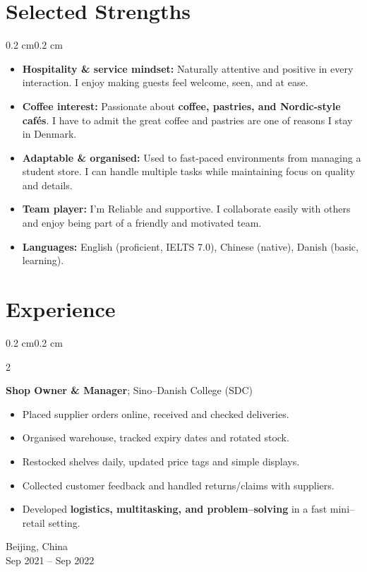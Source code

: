 \documentclass[10pt, letterpaper]{article}
\newenvironment{highlights}{
    \begin{itemize}[
        topsep=0.08 cm,
        parsep=0.08 cm,
        partopsep=0pt,
        itemsep=0pt,
        leftmargin=0.4 cm + 10pt
    ]
}{
    \end{itemize}
}
\newenvironment{onecolentry}{
    \begin{adjustwidth}{0.2 cm}{0.2 cm}
}{
    \end{adjustwidth}
}
\newenvironment{twocolentry}[2][]{
    \onecolentry
    \def\secondColumn{#2}
    \setcolumnwidth{\fill, 4.5 cm}
    \begin{paracol}{2}
}{
    \switchcolumn \raggedleft \secondColumn
    \end{paracol}
    \endonecolentry
}
\begin{document}
    \section{Selected Strengths}
    \begin{onecolentry}
        \begin{highlights}
    \item \textbf{Hospitality \& service mindset:} Naturally attentive and positive in every interaction. I enjoy making guests feel welcome, seen, and at ease.
    \item \textbf{Coffee interest:} Passionate about \textbf{coffee, pastries, and Nordic-style cafés}. I have to admit the great coffee and pastries are one of reasons I stay in Denmark.
    \item \textbf{Adaptable \& organised:} Used to fast-paced environments from managing a student store. I can handle multiple tasks while maintaining focus on quality and details.
    \item \textbf{Team player:} I'm Reliable and supportive. I collaborate easily with others and enjoy being part of a friendly and motivated team.
    \item \textbf{Languages:} English (proficient, IELTS 7.0), Chinese (native), Danish (basic, learning).
\end{highlights}
    \end{onecolentry}

    \section{Experience}

    \begin{twocolentry}{
        Beijing, China\\
        Sep 2021 -- Sep 2022
    }
        \textbf{Shop Owner \& Manager}; Sino–Danish College (SDC)
        \begin{highlights}
            \item Placed supplier orders online, received and checked deliveries.
            \item Organised warehouse, tracked expiry dates and rotated stock.
            \item Restocked shelves daily, updated price tags and simple displays.
            \item Collected customer feedback and handled returns/claims with suppliers.
            \item Developed \textbf{logistics, multitasking, and problem–solving} in a fast mini–retail setting.
        \end{highlights}
    \end{twocolentry}
\end{document}
